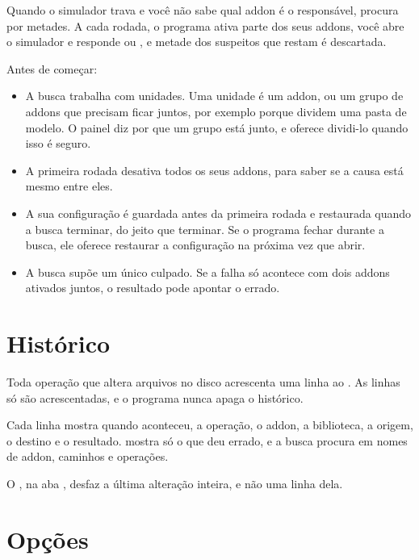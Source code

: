 \documentclass[11pt,a4paper]{article}
\begin{document}
Quando o simulador trava e você não sabe qual addon é o responsável,
 procura por metades. A cada rodada, o programa ativa
parte dos seus addons, você abre o simulador e responde  ou
, e metade dos suspeitos que restam é descartada.


Antes de começar:

\begin{itemize}
  \item A busca trabalha com unidades. Uma unidade é um addon, ou um grupo de
    addons que precisam ficar juntos, por exemplo porque dividem uma pasta de
    modelo. O painel diz por que um grupo está junto, e oferece dividi-lo quando
    isso é seguro.
  \item A primeira rodada desativa todos os seus addons, para saber se a causa
    está mesmo entre eles.
  \item A sua configuração é guardada antes da primeira rodada e restaurada
    quando a busca terminar, do jeito que terminar. Se o programa fechar durante
    a busca, ele oferece restaurar a configuração na próxima vez que abrir.
  \item A busca supõe um único culpado. Se a falha só acontece com dois addons
    ativados juntos, o resultado pode apontar o errado.
\end{itemize}

\section{Histórico}

Toda operação que altera arquivos no disco acrescenta uma linha ao
. As linhas só são acrescentadas, e o programa nunca apaga o
histórico.

Cada linha mostra quando aconteceu, a operação, o addon, a biblioteca, a origem,
o destino e o resultado.  mostra só o que deu errado, e a busca
procura em nomes de addon, caminhos e operações.

O , na aba , desfaz a última
alteração inteira, e não uma linha dela.

\section{Opções}
\end{document}
